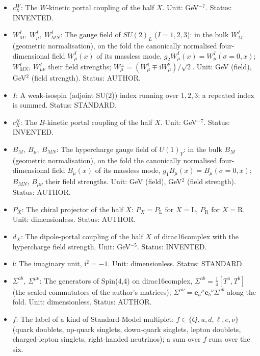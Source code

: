 \documentclass[
  10pt,
]{article}
\begin{document}
\begin{itemize}
  STANDARD.
\item
  \(c^{W}_X\): The \(W\)-kinetic portal coupling of the half \(X\).
  Unit: GeV\(^{-7}\). Status: INVENTED.
\item
  \(W^I_M,\ W^I_\mu,\ W^I_{MN}\): The gauge field of \(SU(2)_L\)
  (\(I = 1, 2, 3\)): in the bulk \(W^I_M\) (geometric normalisation), on
  the fold the canonically normalised four-dimensional field
  \(W^I_\mu(x)\) of its massless mode,
  \(g_2W^I_\mu(x) = W^I_\mu(\sigma = 0, x)\); \(W^I_{MN}\),
  \(W^I_{\mu\nu}\) their field strengths;
  \(W^\pm_\mu = (W^1_\mu \mp \mathrm{i}W^2_\mu)/\sqrt2\). Unit: GeV
  (field), GeV\(^2\) (field strength). Status: AUTHOR.
\item
  \(I\): A weak-isospin (adjoint SU(2)) index running over \(1, 2, 3\);
  a repeated index is summed. Status: STANDARD.
\item
  \(c^{B}_X\): The \(B\)-kinetic portal coupling of the half \(X\).
  Unit: GeV\(^{-7}\). Status: INVENTED.
\item
  \(B_M,\ B_\mu,\ B_{MN}\): The hypercharge gauge field of \(U(1)_Y\):
  in the bulk \(B_M\) (geometric normalisation), on the fold the
  canonically normalised four-dimensional field \(B_\mu(x)\) of its
  massless mode, \(g_1B_\mu(x) = B_\mu(\sigma = 0, x)\); \(B_{MN}\),
  \(B_{\mu\nu}\) their field strengths. Unit: GeV (field), GeV\(^2\)
  (field strength). Status: AUTHOR.
\item
  \(P_X\): The chiral projector of the half \(X\):
  \(P_X = P_{\mathrm{L}}\) for \(X = \mathrm{L}\), \(P_{\mathrm{R}}\)
  for \(X = \mathrm{R}\). Unit: dimensionless. Status: AUTHOR.
\item
  \(d_X\): The dipole-portal coupling of the half \(X\) of
  dirac16complex with the hypercharge field strength. Unit:
  GeV\(^{-5}\). Status: INVENTED.
\item
  \(\mathrm{i}\): The imaginary unit, \(\mathrm{i}^2 = -1\). Unit:
  dimensionless. Status: STANDARD.
\item
  \(\Sigma^{ab},\ \Sigma^{\mu\nu}\): The generators of Spin(4,4) on
  dirac16complex, \(\Sigma^{ab} = \frac14[T^a, T^b]\) (the scaled
  commutators of the author's matrices);
  \(\Sigma^{\mu\nu} = \mathbf{e}_a{}^\mu\mathbf{e}_b{}^\nu\Sigma^{ab}\)
  along the fold. Unit: dimensionless. Status: AUTHOR.
\item
  \(f\): The label of a kind of Standard-Model multiplet:
  \(f \in \{Q, u, d, \ell, e, \nu\}\) (quark doublets, up-quark
  singlets, down-quark singlets, lepton doublets, charged-lepton
  singlets, right-handed neutrinos); a sum over \(f\) runs over the six.

\end{itemize}
\end{document}
